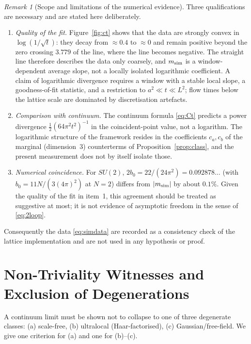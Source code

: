 \documentclass[11pt,a4paper]{article}
\theoremstyle{definition}
\theoremstyle{remark}
\newtheorem{remark}[theorem]{Remark}
\begin{document}
\begin{remark}[Scope and limitations of the numerical evidence]\label{rem:limits}
Three qualifications are necessary and are stated here deliberately.
\begin{enumerate}
\item \emph{Quality of the fit.} Figure~\ref{fig:ct} shows that the data are strongly convex in $\log(1/\sqrt t)$: they decay from $\approx0.4$ to $\approx0$ and remain positive beyond the zero crossing $3.779$ of the line, where the line becomes negative. The straight line therefore describes the data only coarsely, and $m_{\rm sim}$ is a window-dependent average slope, not a locally isolated logarithmic coefficient. A claim of logarithmic divergence requires a window with a stable local slope, a goodness-of-fit statistic, and a restriction to $a^2\ll t\ll L^2$; flow times below the lattice scale are dominated by discretisation artefacts.
\item \emph{Comparison with continuum.} The continuum formula \eqref{eq:Ct} predicts a power divergence $\tfrac12(64\pi^2t^2)^{-1}$ in the coincident-point value, not a logarithm. The logarithmic structure of the framework resides in the coefficients $c_a,c_b$ of the marginal (dimension~$3$) counterterms of Proposition~\ref{prop:class}, and the present measurement does not by itself isolate those.
\item \emph{Numerical coincidence.} For $SU(2)$, $2b_0=22/(24\pi^2)=0.092878\ldots$ (with $b_0=11N/(3(4\pi)^2)$ at $N=2$) differs from $|m_{\rm sim}|$ by about $0.1\%$. Given the quality of the fit in item~1, this agreement should be treated as suggestive at most; it is not evidence of asymptotic freedom in the sense of \eqref{eq:2loop}.
\end{enumerate}
Consequently the data \eqref{eq:simdata} are recorded as a consistency check of the lattice implementation and are not used in any hypothesis or proof.
\end{remark}

\section{Non-Triviality Witnesses and Exclusion of Degenerations}\label{sec:nogo}

A continuum limit must be shown not to collapse to one of three degenerate classes: (a) scale-free, (b) ultralocal (Haar-factorised), (c) Gaussian/free-field. We give one criterion for (a) and one for (b)--(c).
\end{document}
